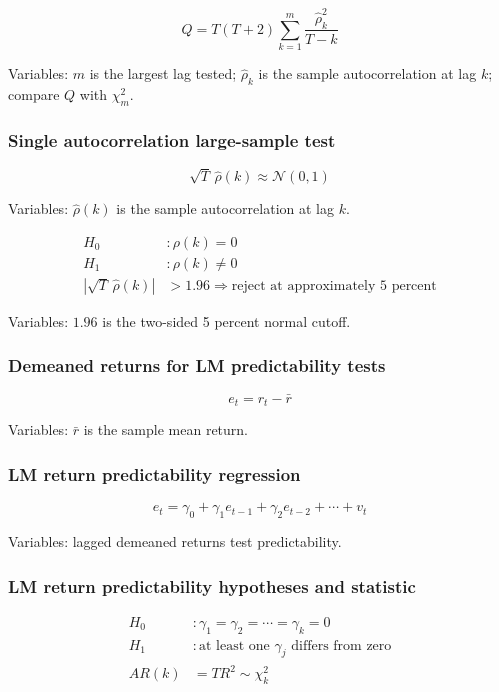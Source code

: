 \documentclass[
  8pt,
  twocolumn]{extarticle}
\begin{document}
\[
Q=T(T+2)\sum_{k=1}^{m}\frac{\hat\rho_k^2}{T-k}
\]

Variables: \(m\) is the largest lag tested; \(\hat\rho_k\) is the sample
autocorrelation at lag \(k\); compare \(Q\) with \(\chi_m^2\).

\subsubsection{Single autocorrelation large-sample
test}\label{single-autocorrelation-large-sample-test}

\[
\sqrt T\,\hat\rho(k)\approx\mathcal N(0,1)
\]

Variables: \(\hat\rho(k)\) is the sample autocorrelation at lag \(k\).

\[
\begin{aligned}
H_0&:\rho(k)=0\\
H_1&:\rho(k)\ne0\\
\left|\sqrt T\,\hat\rho(k)\right|&>1.96\Rightarrow \text{reject at approximately 5 percent}
\end{aligned}
\]

Variables: \(1.96\) is the two-sided 5 percent normal cutoff.

\subsubsection{Demeaned returns for LM predictability
tests}\label{demeaned-returns-for-lm-predictability-tests}

\[
e_t=r_t-\bar r
\]

Variables: \(\bar r\) is the sample mean return.

\subsubsection{LM return predictability
regression}\label{lm-return-predictability-regression}

\[
e_t=\gamma_0+\gamma_1e_{t-1}+\gamma_2e_{t-2}+\cdots+v_t
\]

Variables: lagged demeaned returns test predictability.

\subsubsection{LM return predictability hypotheses and
statistic}\label{lm-return-predictability-hypotheses-and-statistic}

\[
\begin{aligned}
H_0&:\gamma_1=\gamma_2=\cdots=\gamma_k=0\\
H_1&:\text{at least one }\gamma_j\text{ differs from zero}\\
AR(k)&=TR^2\sim\chi_k^2
\end{aligned}
\]
\end{document}
